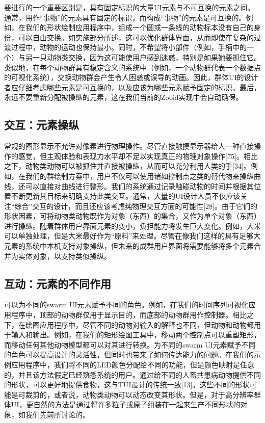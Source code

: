 要进行的一个重要区别是，具有固定标识的大量UI元素与不可互换的元素之间。通常，用作“事物”的元素具有固定的标识，而构成“事物”的元素是可互换的。例如，在我们的形状绘制应用程序中，组成一个圆或一条线的动物标本没有自己的身份，可以自由交换。如实施部分所述，这可以优化群体界面，从而即使在复杂的过渡过程中，动物的运动也保持最小。同时，不希望将小部件（例如，手柄中的一个）与另一只动物类交换，因为这可能使用户感到迷惑，特别是如果她要抓住它。类似地，在每个动物群具有稳定含义的系统中（例如，一个动物群代表一个数据点的可视化系统），交换动物群会产生令人困惑或误导的动画。因此，群体UI的设计者应仔细考虑哪些元素是可互换的，以及应该为哪些元素赋予固定的标识。最后，永远不要重新分配被操纵的元素，这在我们当前的Zooid实现中会自动确保。

\subsection{交互：元素操纵}

常规的图形显示不允许对像素进行物理操作。尽管直接触摸显示器给人一种直接操作的感觉，但主观体验和表现力水平却不足以实现真正的物理对象操作[75]。相比之下，动物类动物可以被抓住并直接被操纵，从而可以充分利用人类的手[34]。例如，在我们的群绘制方案中，用户不仅可以使用诸如控制点之类的替代物来操纵曲线，还可以直接对曲线进行整形。我们的系统通过记录触碰动物的时间并根据其位置不断更新其目标来明确支持此类交互。通常，大量的UI设计人员不仅应该关注“综合”交互的设计，而且还应该考虑纯物理交互方面的可能性[28]。由于它们的形状因素，可将动物类动物既作为对象（东西）的集合，又作为单个对象（东西）进行操纵。随着群体用户界面元素的变小，负担能力将发生巨大变化。例如，大米可以单独处理，但是大米最好作为“原料”来处理。尽管在像我们这样的具有足够大元素的系统中本机支持对象操纵，但未来的成群用户界面将需要能够将多个元素合并为实体对象，以支持类似操纵。

\subsection{互动：元素的不同作用}

可以为不同的swarm UI元素赋予不同的角色。例如，在我们的时间序列可视化应用程序中，顶部的动物群仅用于显示目的，而底部的动物群用作控制器。相比之下，在绘图应用程序中，尽管不同的动物对输入的解释也不同，但动物和动物都用于输入和输出。例如，在我们的矩形绘图工具中，移动两个控制点可以重塑矩形，而移动任何其他动物模型都可以对其进行转换。为不同的swarm UI元素赋予不同的角色可以提高设计的灵活性，但同时也带来了如何传达能力的问题。在我们的示例应用程序中，我们将不同的LED颜色分配给不同的功能，但是颜色映射是任意的，并且该方法假定已经熟悉系统的用户。通过给不同的人畜共患病动物提供不同的形状，可以更好地提供食物，这与TUI设计的传统一致[13]。这些不同的形状可能是可裁剪的，或者说，动物类动物可以动态改变其形状。但是，对于高分辨率群体UI，更自然的方法是通过将许多粒子或原子组装在一起来生产不同形状的对象，如我们先前所讨论的。

